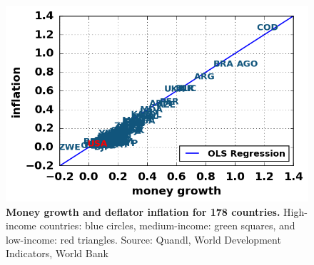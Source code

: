 \begin{figure}[h]
\caption{\label{fig_moneyInflationCoded} \textbf{Money growth and deflator inflation for 178 countries.} High-income countries: blue circles, medium-income: green squares, and low-income: red triangles. {\tiny Source: Quandl, World Development Indicators, World Bank}}
\hspace*{-.5cm}\includegraphics[height = 7.cm]{../png/fig_moneyInflationCoded.png}
\end{figure}
